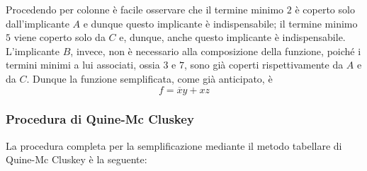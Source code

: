 \documentclass[a4paper]{extarticle}
\begin{document}
\noindent
Procedendo per colonne è facile osservare che il termine minimo $2$ è coperto solo dall'implicante $A$ e dunque questo implicante è indispensabile; il termine minimo $5$ viene coperto solo da $C$ e, dunque, anche questo implicante è indispensabile.\\
L’implicante $B$, invece, non è necessario alla composizione della funzione, poiché i termini minimi a lui associati, ossia $3$ e $7$, sono già coperti rispettivamente da $A$ e da $C$. Dunque la funzione semplificata, come già anticipato, è
\[f = \overline{x}y + xz\]

\newpage
\subsubsection{Procedura di Quine-Mc Cluskey}
La procedura completa per la semplificazione mediante il metodo tabellare di Quine-Mc Cluskey è la seguente:
\end{document}
